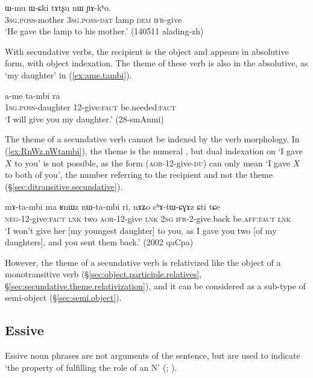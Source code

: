 \begin{exe}
\ex \label{ex:tAtsxu.YAkho} 
\gll ɯ-mu ɯ-ɕki tɤtʂu nɯ ɲɤ-kʰo. \\
\textsc{3sg}.\textsc{poss}-mother \textsc{3sg}.\textsc{poss}-\textsc{dat} lamp \textsc{dem}  \textsc{ifr}-give \\
 \glt `He gave the lamp to his mother.' (140511 alading-zh)
\end{exe}

With secundative verbs, the recipient is the object and appears in absolutive form, with object indexation. The theme of these verb is also in the absolutive, as  `my daughter' in (\ref{ex:ame.tambi}).

\begin{exe}
\ex \label{ex:ame.tambi}
 \gll a-me ta-mbi ra \\
\textsc{1sg}.\textsc{poss}-daughter 1\fl{}2-give:\textsc{fact} be.needed:\textsc{fact} \\
\glt  `I will give you my daughter.'  (28-smAnmi) 
\end{exe}

The theme of a secundative verb cannot be indexed by the verb morphology. In (\ref{ex:RnWz.nWtambi}), the theme is the numeral , but dual indexation on  `I gave $X$ to you' is not possible, as the form  (\textsc{aor}-1\fl{}2-give-\textsc{du}) can only mean `I gave $X$ to both of you', the number referring to the recipient and not the theme (§\ref{sec:ditransitive.secundative}). 

\begin{exe}
\ex \label{ex:RnWz.nWtambi}
 \gll mɤ-ta-mbi ma ʁnɯz nɯ-ta-mbi ri, nɤʑo cʰɤ-tɯ-ɕɣɤz ɕti tɕe \\
 \textsc{neg}-1\fl{}2-give:\textsc{fact} \textsc{lnk} two  \textsc{aor}-1\fl{}2-give \textsc{lnk} \textsc{2sg} \textsc{ifr}-2-give.back be.\textsc{aff}:\textsc{fact} \textsc{lnk} \\
 \glt `I won't give her [my youngest daughter] to you, as I gave you two [of my daughters], and you sent them back.' (2002 qaCpa)
\end{exe}

However, the theme of a secundative verb is relativized like the object of a monotransitive verb (§\ref{sec:object.participle.relatives}, §\ref{sec:secundative.theme.relativization}), and it can be considered as a sub-type of semi-object (§\ref{sec:semi.object}).
 

\subsection{Essive} \label{sec:essive.abs} 
  
Essive noun phrases are not arguments of the sentence, but are used to indicate `the property of fulfilling the role of an N' (\citealt[606]{creissels14functive}; \citealt[225]{jacques16complementation}).

